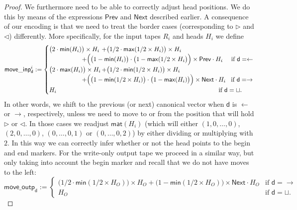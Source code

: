 \begin{proof}
    We furthermore need to be able to correctly adjust head positions. We do this by means of the expressions $\mathsf{Prev}$ and $\mathsf{Next}$	described earlier.
    A consequence of our encoding is that we need to treat the border cases (corresponding to $\rhd$ and 
    $\lhd$) differently. More specifically, for the input tapes $R_i$ and heads $H_i$ we define 
    $$
    \mathsf{move\_inp}^i_{\mathsf{d}}:=
    \begin{cases}
    \bigl(2\cdot\mathsf{min}(H_i)\bigr)\times H_i &\!\!\!\!\!+ \bigl(1/2\cdot\mathsf{max}(1/2\times H_i)\bigr)\times H_i \\
    & \hspace{-4em}+\Bigl(\bigl(1-\mathsf{min}(H_i)\bigr)\cdot\bigl(1-\mathsf{max}(1/2 \times H_i\bigr)\Bigr)\times \mathsf{Prev}\cdot H_i \quad \text{ if $\mathsf{d}=\leftarrow$}\\
    \bigl(2\cdot \mathsf{max}(H_i)\bigr)\times H_i &\!\!\!\!\! + \bigl(1/2\cdot\mathsf{min}(1/2\times H_i)\bigr)\times H_i \\
    & \hspace{-4em}+ \Bigl(\bigl(1-\mathsf{min}(1/2\times H_i)\bigr)\cdot\bigl(1-\mathsf{max}(H_i)\bigr)\Bigr)\times \mathsf{Next}\cdot H_i  \quad\!\text{if $\mathsf{d}=\rightarrow$}\\
    H_i & \hspace{18em}\!\text{if $\mathsf{d}=\sqcup$}. 
    \end{cases}
    $$
    In other words, we shift to the previous (or next) canonical vector when $\mathsf{d}$ is $\leftarrow$ 
    or $\rightarrow$, respectively, unless we need to move to or from the position that will hold $\rhd$ 
    or $\lhd$. In those cases we readjust $\mathsf{mat}(H_i)$ (which will either $(1,0,\ldots,0)$, $(2,0,\ldots,0)$, 
    $(0,\ldots,0,1)$ or $(0,\ldots,0,2)$) by either dividing or multiplying with $2$. In this way we can 
    correctly infer whether or not the head points to the begin and end markers. For the write-only output tape we 
    proceed in a similar way, but only taking into account the begin marker and recall that we do not have 
    moves to the left:
    $$
    \mathsf{move\_outp}_{\mathsf{d}}:=
    \begin{cases}
    \bigl(1/2\cdot\mathsf{min}(1/2\times H_O)\bigr)\times H_O  + \bigl(1-\mathsf{min}(1/2\times H_O)\bigr)\times \mathsf{Next}\cdot H_O  
    & \text{if $\mathsf{d}=\rightarrow$}\\
    H_O & \text{if $\mathsf{d}=\sqcup$}. 
    \end{cases}
    $$

\end{proof}
